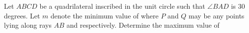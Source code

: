 Let $ABCD$ be a quadrilateral inscribed in the unit circle such that $\angle BAD$ is $30$ degrees. Let $m$ denote the minimum value of  where $P$ and $Q$ may be any points lying along rays $AB$ and  respectively. Determine the maximum value of 